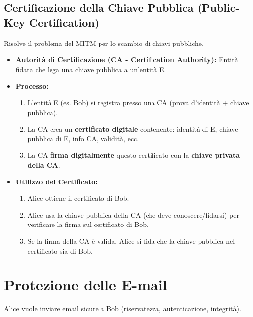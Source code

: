 \subsection{Certificazione della Chiave Pubblica (Public-Key Certification)}
Risolve il problema del MITM per lo scambio di chiavi pubbliche.
\begin{itemize}
    \item \textbf{Autorità di Certificazione (CA - Certification Authority):} Entità fidata che lega una chiave pubblica a un'entità E.
    \item \textbf{Processo:}
    \begin{enumerate}
        \item L'entità E (es. Bob) si registra presso una CA (prova d'identità + chiave pubblica).
        \item La CA crea un \textbf{certificato digitale} contenente: identità di E, chiave pubblica di E, info CA, validità, ecc.
        \item La CA \textbf{firma digitalmente} questo certificato con la \textbf{chiave privata della CA}.
    \end{enumerate}
    \item \textbf{Utilizzo del Certificato:}
    \begin{enumerate}
        \item Alice ottiene il certificato di Bob.
        \item Alice usa la chiave pubblica della CA (che deve conoscere/fidarsi) per verificare la firma sul certificato di Bob.
        \item Se la firma della CA è valida, Alice si fida che la chiave pubblica nel certificato sia di Bob.
    \end{enumerate}
\end{itemize}

\section{Protezione delle E-mail}
\label{sec:protezione_email}

Alice vuole inviare email sicure a Bob (riservatezza, autenticazione, integrità).

